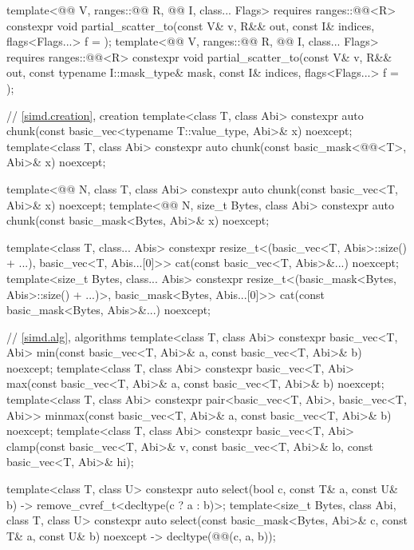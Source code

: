 \begin{codeblock}
{  template<@@ V, ranges::@@ R, @@ I, class... Flags>
    requires ranges::@@<R>
    constexpr void partial_scatter_to(const V& v, R&& out,
                                      const I& indices, flags<Flags...> f = {});
  template<@@ V, ranges::@@ R, @@ I, class... Flags>
    requires ranges::@@<R>
    constexpr void partial_scatter_to(const V& v, R&& out, const typename I::mask_type& mask,
                                      const I& indices, flags<Flags...> f = {});

  // \ref{simd.creation}, creation
  template<class T, class Abi>
    constexpr auto chunk(const basic_vec<typename T::value_type, Abi>& x) noexcept;
  template<class T, class Abi>
    constexpr auto chunk(const basic_mask<@@<T>, Abi>& x) noexcept;

  template<@@ N, class T, class Abi>
    constexpr auto chunk(const basic_vec<T, Abi>& x) noexcept;
  template<@@ N, size_t Bytes, class Abi>
    constexpr auto chunk(const basic_mask<Bytes, Abi>& x) noexcept;

  template<class T, class... Abis>
    constexpr resize_t<(basic_vec<T, Abis>::size() + ...),
      basic_vec<T, Abis...[0]>> cat(const basic_vec<T, Abis>&...) noexcept;
  template<size_t Bytes, class... Abis>
    constexpr resize_t<(basic_mask<Bytes, Abis>::size() + ...)>,
      basic_mask<Bytes, Abis...[0]>> cat(const basic_mask<Bytes, Abis>&...) noexcept;

  // \ref{simd.alg}, algorithms
  template<class T, class Abi>
    constexpr basic_vec<T, Abi>
      min(const basic_vec<T, Abi>& a, const basic_vec<T, Abi>& b) noexcept;
  template<class T, class Abi>
    constexpr basic_vec<T, Abi>
      max(const basic_vec<T, Abi>& a, const basic_vec<T, Abi>& b) noexcept;
  template<class T, class Abi>
    constexpr pair<basic_vec<T, Abi>, basic_vec<T, Abi>>
      minmax(const basic_vec<T, Abi>& a, const basic_vec<T, Abi>& b) noexcept;
  template<class T, class Abi>
    constexpr basic_vec<T, Abi>
      clamp(const basic_vec<T, Abi>& v, const basic_vec<T, Abi>& lo,
            const basic_vec<T, Abi>& hi);

  template<class T, class U>
    constexpr auto select(bool c, const T& a, const U& b)
    -> remove_cvref_t<decltype(c ? a : b)>;
  template<size_t Bytes, class Abi, class T, class U>
    constexpr auto select(const basic_mask<Bytes, Abi>& c, const T& a, const U& b)
    noexcept -> decltype(@@(c, a, b));

}
\end{codeblock}
